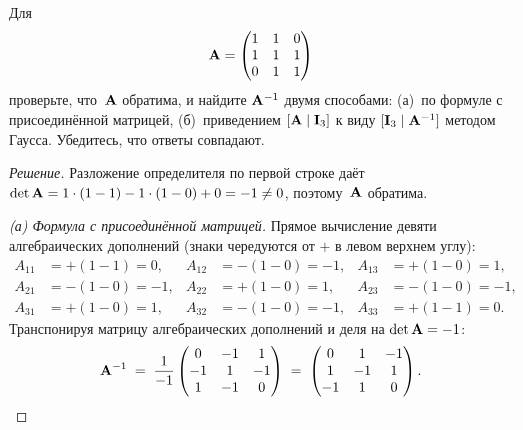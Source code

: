 \begin{problem}
\label{prob:invert-3x3}
Для
\[
  \mathbf{A} = \begin{pmatrix}
    1 & 1 & 0 \\
    1 & 1 & 1 \\
    0 & 1 & 1
  \end{pmatrix}
\]
проверьте, что~$\mathbf{A}$ обратима, и найдите $\mathbf{A}^{-1}$ двумя
способами: (а)~по формуле с присоединённой матрицей, (б)~приведением
$[\mathbf{A} \mid \mathbf{I}_3]$ к виду $[\mathbf{I}_3 \mid \mathbf{A}^{-1}]$
методом Гаусса. Убедитесь, что ответы совпадают.
\end{problem}

\begin{proof}[Решение]
Разложение определителя по первой строке даёт
$\det \mathbf{A} = 1 \cdot (1 - 1) - 1 \cdot (1 - 0) + 0 = -1 \neq 0$,
поэтому~$\mathbf{A}$ обратима.

\emph{(а) Формула с присоединённой матрицей.} Прямое вычисление девяти
алгебраических дополнений (знаки чередуются от $+$ в левом верхнем
углу):
\[
  \begin{aligned}
    A_{11} &= +(1-1) = 0,
    & A_{12} &= -(1-0) = -1,
    & A_{13} &= +(1-0) = 1, \\
    A_{21} &= -(1-0) = -1,
    & A_{22} &= +(1-0) = 1,
    & A_{23} &= -(1-0) = -1, \\
    A_{31} &= +(1-0) = 1,
    & A_{32} &= -(1-0) = -1,
    & A_{33} &= +(1-1) = 0.
  \end{aligned}
\]
Транспонируя матрицу алгебраических дополнений и деля на
$\det \mathbf{A} = -1$:
\[
  \mathbf{A}^{-1} \;=\; \frac{1}{-1}
  \begin{pmatrix} 0 & -1 & 1 \\ -1 & 1 & -1 \\ 1 & -1 & 0 \end{pmatrix}
  \;=\;
  \begin{pmatrix} 0 & 1 & -1 \\ 1 & -1 & 1 \\ -1 & 1 & 0 \end{pmatrix}.
\]


\end{proof}
